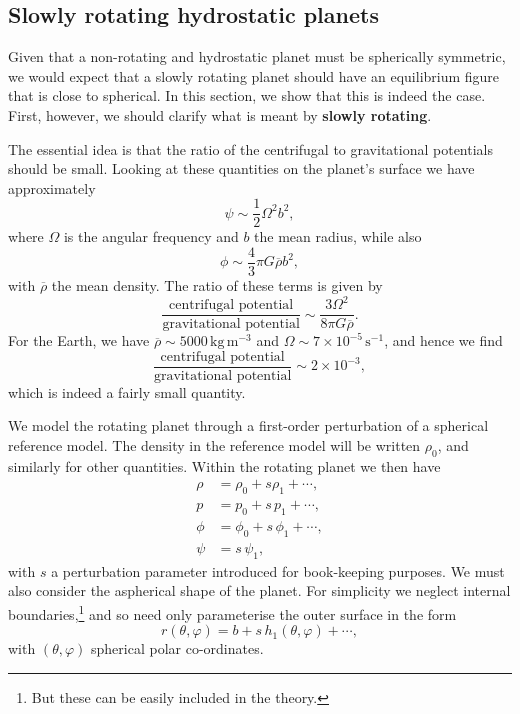 \subsection*{Slowly rotating hydrostatic planets}
Given that a non-rotating and hydrostatic planet must be spherically symmetric, we would expect that a slowly rotating planet 
should have an equilibrium figure that is close to spherical. In this section, we show that this is indeed the case. First, 
however, we should clarify what is meant by \textbf{slowly rotating}. 

The essential idea is that the ratio of the centrifugal to gravitational potentials should be small. 
Looking at these quantities on the planet's surface we have approximately
\begin{equation}
\psi\sim\frac{1}{2}\Omega^{2}b^{2},
\label{eq:13}
\end{equation}
where $\Omega$ is the angular frequency and $b$ the mean radius, while also
\begin{equation}
\phi\sim\frac{4}{3}\pi G\overline{\rho}b^{2},
\label{eq:14}
\end{equation}
with $\overline{\rho}$ the mean density. The ratio of these terms is given by
\begin{equation}
\frac{\text{centrifugal potential}}{\text{gravitational potential}}\sim\frac{3\Omega^{2}}{8\pi G\overline{\rho}}.
\label{eq:15}
\end{equation}
For the Earth, we have $\overline{\rho}\sim5000\,\mathrm{kg\,m^{-3}}$ and $\Omega\sim7\times10^{-5}\,\mathrm{s^{-1}}$, and hence we find
\begin{equation}
\frac{\text{centrifugal potential}}{\text{gravitational potential}}\sim2\times10^{-3},
\label{eq:16}
\end{equation}
which is indeed a fairly small quantity.

We model the rotating planet through a first-order perturbation of a spherical reference model. The density in 
the reference model will be written $\rho_{0}$, and similarly for other quantities. Within the rotating planet we then have
\begin{align}
\rho&=\rho_{0}+s\rho_{1}+\cdots, \label{eq:17}\\
p&=p_{0}+s\,p_{1}+\cdots, \label{eq:18}\\
\phi&=\phi_{0}+s\,\phi_{1}+\cdots, \label{eq:19}\\
\psi&=s\,\psi_{1}, \label{eq:20}
\end{align}
with $s$ a perturbation parameter introduced for book-keeping purposes. We must also consider the aspherical shape of the planet. 
For simplicity we neglect internal boundaries,\footnote{But these can be easily included in the theory.} and so need only 
parameterise the outer surface in the form
\begin{equation}
r(\theta,\varphi)=b+s\,h_{1}(\theta,\varphi)+\cdots,
\label{eq:21}
\end{equation}
with $(\theta,\varphi)$ spherical polar co-ordinates. 

